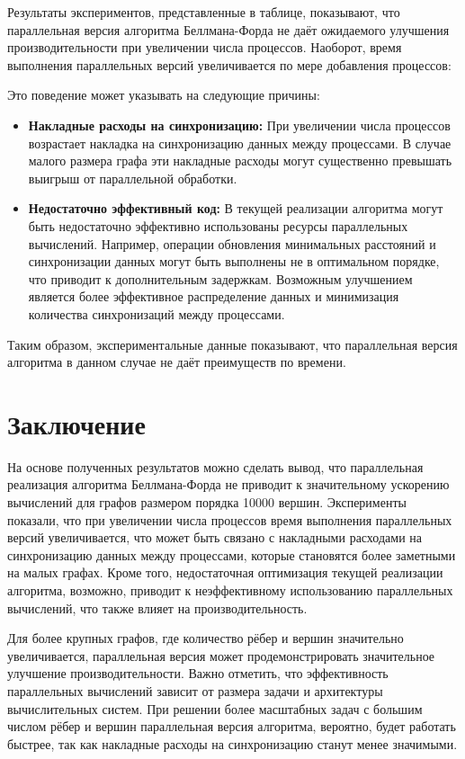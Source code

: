 \documentclass[12pt]{article}
\begin{document}
Результаты экспериментов, представленные в таблице, показывают, что параллельная версия алгоритма Беллмана-Форда не даёт ожидаемого улучшения производительности при увеличении числа процессов. Наоборот, время выполнения параллельных версий увеличивается по мере добавления процессов:

Это поведение может указывать на следующие причины:
\begin{itemize}
    \item \textbf{Накладные расходы на синхронизацию:} При увеличении числа процессов возрастает накладка на синхронизацию данных между процессами. В случае малого размера графа эти накладные расходы могут существенно превышать выигрыш от параллельной обработки.
    \item \textbf{Недостаточно эффективный код:} В текущей реализации алгоритма могут быть недостаточно эффективно использованы ресурсы параллельных вычислений. Например, операции обновления минимальных расстояний и синхронизации данных могут быть выполнены не в оптимальном порядке, что приводит к дополнительным задержкам. Возможным улучшением является более эффективное распределение данных и минимизация количества синхронизаций между процессами.
\end{itemize}


Таким образом, экспериментальные данные показывают, что параллельная версия алгоритма в данном случае не даёт преимуществ по времени.

\newpage
\section*{Заключение}

На основе полученных результатов можно сделать вывод, что параллельная реализация алгоритма Беллмана-Форда не приводит к значительному ускорению вычислений для графов размером порядка 10000 вершин. Эксперименты показали, что при увеличении числа процессов время выполнения параллельных версий увеличивается, что может быть связано с накладными расходами на синхронизацию данных между процессами, которые становятся более заметными на малых графах. Кроме того, недостаточная оптимизация текущей реализации алгоритма, возможно, приводит к неэффективному использованию параллельных вычислений, что также влияет на производительность.

Для более крупных графов, где количество рёбер и вершин значительно увеличивается, параллельная версия может продемонстрировать значительное улучшение производительности. Важно отметить, что эффективность параллельных вычислений зависит от размера задачи и архитектуры вычислительных систем. При решении более масштабных задач с большим числом рёбер и вершин параллельная версия алгоритма, вероятно, будет работать быстрее, так как накладные расходы на синхронизацию станут менее значимыми.
\end{document}
